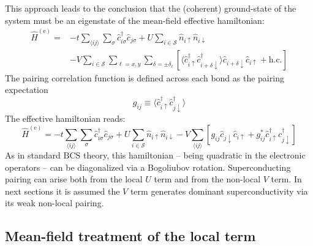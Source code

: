 This approach leads to the conclusion that the (coherent) ground-state of the system must be an eigenstate of the mean-field effective hamiltonian:
\begin{equation}\label{eq:extended-hubbard-model-effective-intermediate}
	\begin{aligned}
		\hat H^{(\mathrm{e})} =
		&-t \sum_{\langle ij \rangle} \sum_\sigma \hat c_{i\sigma}^\dagger \hat c_{j\sigma}
		+ U \sum_{i \in \mathcal{S}} \hat n_{i\uparrow} \hat n_{i\downarrow} \\
		&- V \sum_{i \in \mathcal{S}} \sum_{\ell = x,y} \sum_{\delta = \pm \delta_\ell} \left[
			\langle 
				\hat c_{i\uparrow}^\dagger \hat c_{i + \delta \downarrow}^\dagger
			\rangle
			\hat c_{i + \delta \downarrow} \hat c_{i\uparrow} 
			+ \mathrm{h}.\mathrm{c}.
		\right]
	\end{aligned}
\end{equation}
The pairing correlation function is defined across each bond as the pairing expectation
\[
	g_{ij} \equiv \langle 
		\hat c_{i\uparrow}^\dagger \hat c_{j\downarrow}^\dagger
	\rangle
\]
The effective hamiltonian reads:
\begin{equation}\label{eq:extended-hubbard-model-effective-intermediate-2}
	\hat H^{(\mathrm{e})} =
	-t \sum_{\langle ij \rangle} \sum_\sigma \hat c_{i\sigma}^\dagger \hat c_{j\sigma}
	+ U \sum_{i \in \mathcal{S}} \hat n_{i\uparrow} \hat n_{i\downarrow}
	- V \sum_{\langle ij \rangle} \left[
		g_{ij} \hat c_{j\downarrow} \hat c_{i\uparrow} + g_{ij}^* \hat c_{i\uparrow}^\dagger \hat c_{j\downarrow}^\dagger
	\right]
\end{equation}
As in standard $\mathrm{BCS}$ theory, this hamiltonian -- being quadratic in the electronic operators -- can be diagonalized via a Bogoliubov rotation. Superconducting pairing can arise both from the local $U$ term and from the non-local $V$ term. In next sections it is assumed the $V$ term generates dominant superconductivity via its weak non-local pairing.

\subsection{Mean-field treatment of the local term}

